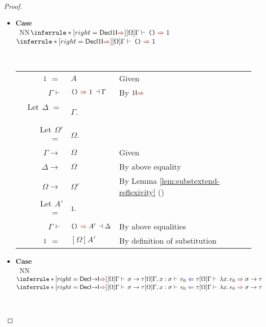 \documentclass[a4paper]{article}
\makeatletter
\newcommand{\mathcolor}[2]{\text{\textcolor{#1}{\ensuremath{#2}}}}
\newcommand{\arr}{\rightarrow}
\def\CompactJudgments{0}
\newcommand{\entails}{\mathrel{\ifnum\CompactJudgments=1\vdash \else \vdash\,\fi}}
\newcommand{\ctxoutsym}{\ifnum\CompactJudgments=1\dashv \else \,\dashv \fi}
\newcommand{\ctxout}[1]{\mathrel{\ctxoutsym}{#1}}
\newcommand{\tyname}[1]{\textsf{\normalfont #1}}
\newcommand{\unitexp}{\text{\normalfont \tt()}}
\newcommand{\unitty}{\tyname{1}}
\newcommand{\Lemmaref}[1]{Lemma \ref{#1} (\nameref{#1})}   \newcommand{\Lemref}[1]{\Lemma \ref{#1}}   \newcommand{\Conjectureref}[1]{Conjecture \ref{#1}}
\gdef\xxDerivationProofCaseColor{N}
\newcommand{\DerivationProofCase}[3]{\smallskip
     \item \parbox[t]{100ex}{\textbf{Case } \\[-0.5em]
       $~$\hspace{5ex}
       \if\xxDerivationProofCaseColor N\ensuremath{\Infer{#1}{#2}{#3}}
       \else \colorbox{\xxDerivationProofCaseColor}{\ensuremath{\Infer{#1}{#2}{#3}}}\fi }\nopagebreak \\[-0.8ex]
  }
\newcommand{\BeginProof}{\renewcommand{\arraystretch}{1.1} \begin{tabular}[b]{r@{}r @{} l  l}}
\newcommand{\EndProof}{\end{tabular} \renewcommand{\arraystretch}{\mydefaultarraystretch}}
\newcommand{\Hand}{\text{\Pointinghand~~~~}}
\newcommand{\Pf}[4] {&$#1$ $#2$\, & $#3$ & #4 \\}
\newcommand{\Pfmrg}[3] {&$#1$\, & $#2$ & #3 \\}
\newcommand{\LetPf}[3] {\Pf{\text{Let}\,~{#1}}{=\,}{#2\text{.}}{#3}}
\newcommand{\mkpf}[4] {\Pf{#2}{#1\,}{#3}{#4}}
\newcommand{\eqPf}[3] {\mkpf{=}{#1}{#2}{#3}}
\newenvironment{llproof}{\BeginProof}{\EndProof}
\newcommand{\Infer}[3]{\inferrule*[right={\text{\strut#1}}]{{}#2\mathstrut}{{}#3\mathstrut}}
\newcommand{\lam}[1]{\lambda #1.\,}
\newcommand{\substextendPf}[3] {\Pfmrg{{#1} \extendssym\,}{#2}{#3}}
\newcommand{\chkcolor}{dBlue}
\newcommand{\syncolor}{dRed}
\newcommand{\chk}{\mathrel{\mathcolor{\chkcolor}{\Leftarrow}}}
\newcommand{\uncoloredsyn}{{\Rightarrow}}
\newcommand{\syn}{\mathrel{\mathcolor{\syncolor}{\uncoloredsyn}}}
\newcommand{\declchkjudg}[3]{\ensuremath{{#1} \entails {#2} \chk {#3}}}
\newcommand{\declsynjudg}[3]{\ensuremath{{#1} \entails {#2} \syn {#3}}}
\newcommand{\synjudgPf}[5]{\Pf{#1}{\entails}{{#2} \syn {#3} \ctxout{#4}}{#5}}
\newcommand{\extendssym}{\longrightarrow}
\newcommand{\judgetp}[2]{{#1} \entails {#2}}
\newcommand{\rulename}[1]{\text{\normalfont\textsf{#1}}}
\newcommand{\Decltyrulename}[1]{\ensuremath{\rulename{Decl#1}}\xspace}
\newcommand{\DeclIntroSynrulename}[1]{\Decltyrulename{\ensuremath{#1}I$\syn$}}
\newcommand{\DeclUnitIntroSyn}{\DeclIntroSynrulename{\unitty}}
\newcommand{\DeclArrIntroSyn}{\DeclIntroSynrulename{\arr}}
\newcommand{\Tyrulename}[1]{\ensuremath{\rulename{#1}}\xspace}
\newcommand{\IntroSynrulename}[1]{\Tyrulename{\ensuremath{#1}I$\syn$}}
\newcommand{\UnitIntroSyn}{\IntroSynrulename{\unitty}}
\makeatother
\begin{document}
\begin{proof}
\begin{itemize}
\DerivationProofCase{\DeclUnitIntroSyn}
                { }
                {\declsynjudg{[\Omega]\Gamma}{\unitexp}{\unitty}}

                \begin{llproof}
                  \eqPf {\unitty} {A}   {Given}
                  \synjudgPf{\Gamma} {\unitexp} {\unitty}  {\Gamma}   {By \UnitIntroSyn}
                  \LetPf{\Delta}{\Gamma}  {}
                  \LetPf{\Omega'}{\Omega}  {}
                  \substextendPf{\Gamma}{\Omega}  {Given}
\Hand             \substextendPf{\Delta}{\Omega}  {By above equality}
\Hand             \substextendPf{\Omega}{\Omega'}  {By \Lemmaref{lem:substextend-reflexivity}}
                  \LetPf{A'}{\unitty}  {}
\Hand             \synjudgPf{\Gamma} {\unitexp} {A'}  {\Delta}   {By above equalities}
\Hand             \eqPf {\unitty}  {[\Omega]A'}  {By definition of substitution}
                \end{llproof}

                \bigskip

          \DerivationProofCase{\DeclArrIntroSyn}
                {\judgetp{[\Omega]\Gamma}{\sigma \arr \tau}
                 \\
                 \declchkjudg{[\Omega]\Gamma, x : \sigma}{e_0}{\tau}
                }
                {\declsynjudg{[\Omega]\Gamma}{\lam{x} e_0}{\sigma \arr \tau}}

                \medskip


\end{itemize}
\end{proof}
\end{document}
